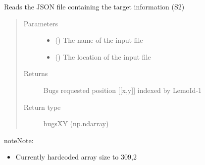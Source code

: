 \documentclass[letterpaper,10pt,english]{sphinxmanual}
\begin{document}
\begin{fulllineitems}
\label{\detokenize{reference:taipanPyRouter.openS2JSONTile}}
Reads the JSON file containing the target information (S2)
\begin{quote}\begin{description}
\item[{Parameters}] \leavevmode\begin{itemize}
\item {} 
 () \textendash{} The name of the input file

\item {} 
 () \textendash{} The location of the input file

\end{itemize}

\item[{Returns}] \leavevmode
Bugs requested position {[}{[}x,y{]}{]} indexed by LemoId-1

\item[{Return type}] \leavevmode
bugsXY (np.ndarray)

\end{description}\end{quote}

\begin{sphinxadmonition}{note}{Note:}\begin{itemize}
\item {} 
Currently hardcoded array size to 309,2

\end{itemize}
\end{sphinxadmonition}

\end{fulllineitems}

\end{document}
